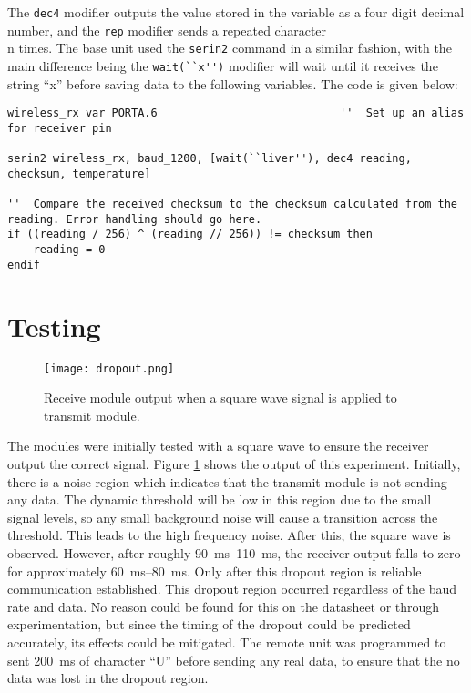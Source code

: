The \verb|dec4| modifier outputs the value stored in the variable as a four digit decimal number, and the \verb|rep| modifier sends a repeated character \\n times. The base unit used the \verb|serin2| command in a similar fashion, with the main difference being the \verb|wait(``x'')| modifier will wait until it receives the string ``x'' before saving data to the following variables. The code is given below:

\begin{lstlisting}
wireless_rx var PORTA.6                            ''  Set up an alias for receiver pin

serin2 wireless_rx, baud_1200, [wait(``liver''), dec4 reading, checksum, temperature]

''  Compare the received checksum to the checksum calculated from the reading. Error handling should go here.
if ((reading / 256) ^ (reading // 256)) != checksum then
    reading = 0
endif
\end{lstlisting}





\section{Testing}
\begin{figure}[htbp]
	\centering
	\texttt{[image: dropout.png]}
	\caption{Receive module output when a square wave signal is applied to transmit module.}
	\label{fig: dropout}
\end{figure}

The modules were initially tested with a square wave to ensure the receiver output the correct signal. Figure \ref{fig: dropout} shows the output of this experiment. Initially, there is a noise region which indicates that the transmit module is not sending any data. The dynamic threshold will be low in this region due to the small signal levels, so any small background noise will cause a transition across the threshold. This leads to the high frequency noise. After this, the square wave is observed. However, after roughly \SIrange{90}{110}{\milli\second}, the receiver output falls to zero for approximately \SIrange{60}{80}{\milli\second}. Only after this dropout region is reliable communication established. This dropout region occurred regardless of the baud rate and data. No reason could be found for this on the datasheet or through experimentation, but since the timing of the dropout could be predicted accurately, its effects could be mitigated. The remote unit was programmed to sent \SI{200}{\milli\second} of character ``U'' before sending any real data, to ensure that the no data was lost in the dropout region.\\









